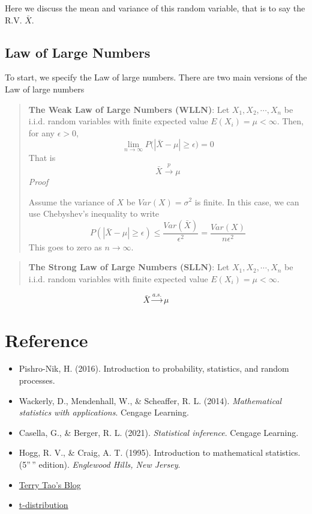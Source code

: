 \documentclass[
  letterpaper,
  DIV=11,
  numbers=noendperiod]{scrreprt}
\theoremstyle{plain}
\theoremstyle{remark}
\begin{document}
Here we discuss the mean and variance of this random variable, that is
to say the R.V. \(\bar{X}\).

\hypertarget{law-of-large-numbers}{%
\subsection{Law of Large Numbers}\label{law-of-large-numbers}}

To start, we specify the Law of large numbers. There are two main
versions of the Law of large numbers

\begin{quote}
\textbf{The Weak Law of Large Numbers (WLLN)}: Let
\(X_1,X_2,\cdots,X_n\) be i.i.d. random variables with finite expected
value \(E(X_i)=\mu<\infty\). Then, for any \(\epsilon>0\), \[
\lim_{n\rightarrow \infty}P\big(|\bar{X}-\mu| \geq \epsilon\big)=0
\] That is \[
\bar{X}\xrightarrow{p} \mu
\] \emph{Proof}

Assume the variance of \(X\) be \(Var(X)=\sigma^2\) is finite. In this
case, we can use Chebyshev's inequality to write \[
P(|\bar{X}-\mu| \geq \epsilon) \leq \frac{Var(\bar{X})}{\epsilon^2}=\frac{Var(X)}{n\epsilon^2}
\] This goes to zero as \(n\rightarrow \infty\).
\end{quote}

\begin{quote}
\textbf{The Strong Law of Large Numbers (SLLN)}: Let
\(X_1,X_2,\cdots,X_n\) be i.i.d. random variables with finite expected
value \(E(X_i)=\mu<\infty\).
\end{quote}

\[
 \bar{X} \xrightarrow{a.s.} \mu
 \]

\hypertarget{reference}{%
\section{Reference}\label{reference}}

\begin{itemize}
\item
  Pishro-Nik, H. (2016). Introduction to probability, statistics, and
  random processes.
\item
  Wackerly, D., Mendenhall, W., \& Scheaffer, R. L. (2014).
  \emph{Mathematical statistics with applications}. Cengage Learning.
\item
  Casella, G., \& Berger, R. L. (2021). \emph{Statistical inference}.
  Cengage Learning.
\item
  Hogg, R. V., \& Craig, A. T. (1995). Introduction to mathematical
  statistics.(5''\,'' edition). \emph{Englewood Hills, New Jersey}.
\item
  \href{https://terrytao.wordpress.com/2008/06/18/the-strong-law-of-large-numbers/}{Terry
  Tao's Blog}
\item
  \href{https://math.stackexchange.com/questions/474733/derivation-of-the-density-function-of-student-t-distribution-from-this-big-integ}{t-distribution}
\end{itemize}
\end{document}
